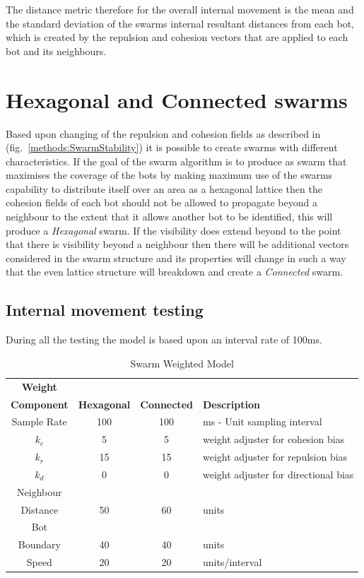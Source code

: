 \documentclass[10pt,journal,letterpaper,twoside]{IEEEtran}
\newcommand{\swarmA}{Hexagonal}
\newcommand{\swarmB}{Connected}
\newcommand{\stability}{internal movement}
\newcommand{\Stability}{Internal movement}
\newcommand{\Fig}{fig.}
\begin{document}
The distance metric therefore for the overall \stability{} is the mean
and the standard deviation of the swarms internal resultant distances
from each bot, which is created by the repulsion and cohesion vectors
that are applied to each bot and its neighbours.

\section{\swarmA{} and \swarmB{} swarms\label{methods:SwarmTypesStability1}}

Based upon changing of the repulsion and cohesion fields as described
in (\Fig{}~\ref{methods:SwarmStability}) it is possible to create
swarms with different characteristics. If the goal of the swarm
algorithm is to produce as swarm that maximises the coverage of the
bots by making maximum use of the swarms capability to distribute
itself over an area as a hexagonal lattice then the cohesion fields of
each bot should not be allowed to propagate beyond a neighbour to the
extent that it allows another bot to be identified, this will produce
a \textit{\swarmA{}} swarm. If the visibility does extend beyond to
the point that there is visibility beyond a neighbour then there will
be additional vectors considered in the swarm structure and its
properties will change in such a way that the even lattice structure
will breakdown and create a \textit{\swarmB{}} swarm.

\subsection{\Stability{} testing}\label{Section:StabilityTesting}

During all the testing the model is based upon an interval rate of 100ms.

\begin{center}
\begin{table}[H]
\begin{tabular}{ c | c | c | p{3cm}}
\bf Weight \\\bf Component & \bf \swarmA{} & \bf \swarmB{} & \bf Description \\ \hline
Sample Rate & 100 & 100 & ms - Unit sampling interval\\  \hline
$k_c$ & 5 & 5 & weight adjuster for cohesion bias\\  \hline
$k_r$ & 15 & 15 & weight adjuster for repulsion  bias\\  \hline
$k_d$ & 0 & 0 & weight adjuster for directional bias\\  \hline
Neighbour \\ Distance & 50 & 60 &  units\\  \hline
Bot \\ Boundary & 40 & 40 & units\\  \hline
Speed & 20 & 20 & units/interval\\  \hline
\end{tabular}
\caption{Swarm Weighted Model} \label{tab:Physics2}
\end{table}
\end{center}
\end{document}
